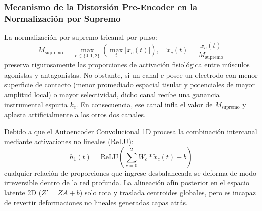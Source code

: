 \documentclass[11pt,a4paper]{article}
\begin{document}
\subsubsection{Mecanismo de la Distorsión Pre-Encoder en la Normalización por Supremo}
La normalización por supremo tricanal por pulso:
\begin{equation}
M_{\text{supremo}} = \max_{c \in \{0, 1, 2\}} \left( \max_t |x_c(t)| \right), \quad \tilde{x}_c(t) = \frac{x_c(t)}{M_{\text{supremo}}}
\end{equation}
preserva rigurosamente las proporciones de activación fisiológica entre músculos agonistas y antagonistas. No obstante, si un canal $c$ posee un electrodo con menor superficie de contacto (menor promediado espacial tisular y potenciales de mayor amplitud local) o mayor selectividad, dicho canal recibe una ganancia instrumental espuria $k_c$. En consecuencia, ese canal infla el valor de $M_{\text{supremo}}$ y aplasta artificialmente a los otros dos canales.

Debido a que el Autoencoder Convolucional 1D procesa la combinación intercanal mediante activaciones no lineales ($\text{ReLU}$):
\begin{equation}
h_1(t) = \text{ReLU}\left( \sum_{c=0}^2 W_c * \tilde{x}_c(t) + b \right)
\end{equation}
cualquier relación de proporciones que ingrese desbalanceada se deforma de modo irreversible dentro de la red profunda. La alineación afín posterior en el espacio latente 2D ($Z' = Z A + b$) solo rota y traslada centroides globales, pero es incapaz de revertir deformaciones no lineales generadas capas atrás.
\end{document}
